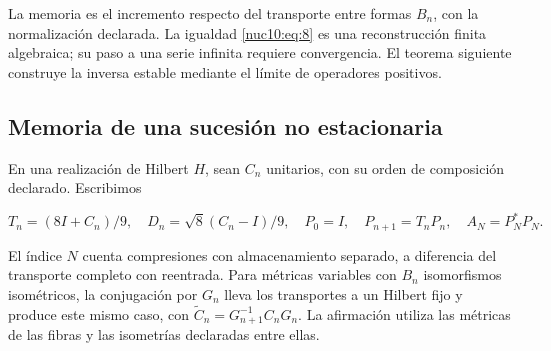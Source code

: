La memoria es el incremento respecto del transporte entre formas \(B_n\), con la normalización declarada. La igualdad \eqref{nuc10:eq:8} es una reconstrucción finita algebraica; su paso a una serie infinita requiere convergencia. El teorema siguiente construye la inversa estable mediante el límite de operadores positivos.

\subsection{Memoria de una sucesión no estacionaria}

En una realización de Hilbert \(H\), sean \(C_n\) unitarios, con su orden de composición declarado. Escribimos



\[
T_n=(8I+C_n)/9,\quad D_n=\sqrt8(C_n-I)/9,
\quad P_0=I,\quad P_{n+1}=T_nP_n,\quad A_N=P_N^*P_N.
\]



El índice \(N\) cuenta compresiones con almacenamiento separado, a diferencia del transporte completo con reentrada. Para métricas variables con \(B_n\) isomorfismos isométricos, la conjugación por \(G_n\) lleva los transportes a un Hilbert fijo y produce este mismo caso, con \(\widetilde C_n=G_{n+1}^{-1}C_nG_n\). La afirmación utiliza las métricas de las fibras y las isometrías declaradas entre ellas.

